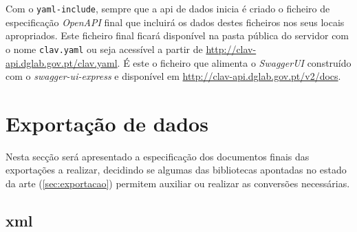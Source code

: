 Com o \texttt{yaml-include}, sempre que a \acrshort{api} de dados inicia é criado o ficheiro de especificação \textit{OpenAPI} final que incluirá os dados destes ficheiros nos seus locais apropriados. Este ficheiro final ficará disponível na pasta pública do servidor com o nome \texttt{clav.yaml} ou seja acessível a partir de \url{http://clav-api.dglab.gov.pt/clav.yaml}. É este o ficheiro que alimenta o \textit{SwaggerUI} construído com o \textit{swagger-ui-express} e disponível em \url{http://clav-api.dglab.gov.pt/v2/docs}.

\section{Exportação de dados}

Nesta secção será apresentado a especificação dos documentos finais das exportações a realizar, decidindo se algumas das bibliotecas apontadas no estado da arte (\ref{sec:exportacao}) permitem auxiliar ou realizar as conversões necessárias.

\subsection{\acrshort{xml}}

